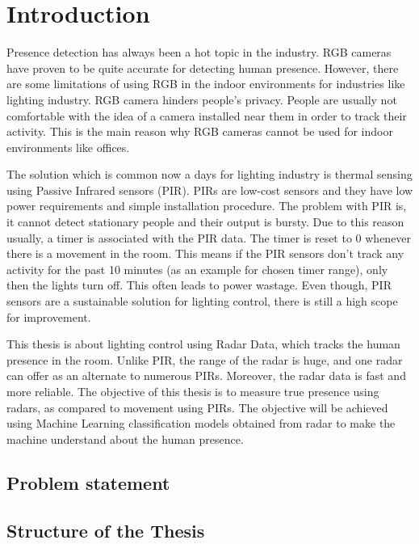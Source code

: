 \chapter{Introduction}
\label{chapter:intro}
Presence detection has always been a hot topic in the industry. RGB cameras have proven to be quite accurate for detecting human presence. However, there are some limitations of using RGB in the indoor environments for industries like lighting industry. RGB camera hinders people’s privacy. People are usually not comfortable with the idea of a camera installed near them in order to track their activity. This is the main reason why RGB cameras cannot be used for indoor environments like offices.


The solution which is common now a days for lighting industry is thermal sensing using Passive Infrared sensors (PIR). PIRs are low-cost sensors and they have low power requirements and simple installation procedure. The problem with PIR is, it cannot detect stationary people and their output is bursty. Due to this reason usually, a timer is associated with the PIR data. The timer is reset to 0 whenever there is a movement in the room. This means if the PIR sensors don’t track any activity for the past 10 minutes (as an example for chosen timer range), only then the lights turn off. This often leads to power wastage. Even though, PIR sensors are a sustainable solution for lighting control, there is still a high scope for improvement.

This thesis is about lighting control using Radar Data, which tracks the human presence in the room. Unlike PIR, the range of the radar is huge, and one radar can offer as an alternate to numerous PIRs. Moreover, the radar data is fast and more reliable. The objective of this thesis is to measure true presence using radars, as compared to movement using PIRs. The objective will be achieved using Machine Learning classification models obtained from radar to make the machine understand about the human presence.


\section{Problem statement}




\section{Structure of the Thesis}
\label{section:structure} 


